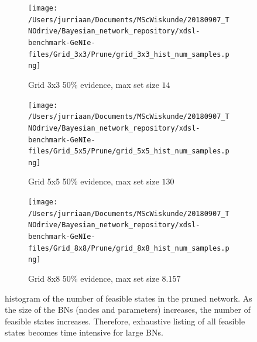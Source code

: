 \documentclass[a4paper, twoside, 11pt]{report}
\theoremstyle{plain}
\theoremstyle{definition}
\theoremstyle{remark}
\begin{document}
\begin{figure}[h!]
\begin{subfigure}{.3\linewidth}
\texttt{[image: /Users/jurriaan/Documents/MScWiskunde/20180907\_TNOdrive/Bayesian\_network\_repository/xdsl-benchmark-GeNIe-files/Grid\_3x3/Prune/grid\_3x3\_hist\_num\_samples.png]}
\caption{Grid 3x3 50\% evidence, max set size $14$}%
\label{grid_3x3}%
\end{subfigure}\hfill%
\begin{subfigure}{.3\linewidth}
\texttt{[image: /Users/jurriaan/Documents/MScWiskunde/20180907\_TNOdrive/Bayesian\_network\_repository/xdsl-benchmark-GeNIe-files/Grid\_5x5/Prune/grid\_5x5\_hist\_num\_samples.png]}
\caption{Grid 5x5 50\% evidence, max set size $130$}%
\label{grid_5x5}%
\end{subfigure}\hfill%
\begin{subfigure}{.3\linewidth}
\texttt{[image: /Users/jurriaan/Documents/MScWiskunde/20180907\_TNOdrive/Bayesian\_network\_repository/xdsl-benchmark-GeNIe-files/Grid\_8x8/Prune/grid\_8x8\_hist\_num\_samples.png]}
\caption{Grid 8x8 50\% evidence, max set size $8.157$}%
\label{grid_8x8}%
\end{subfigure}\hfill%

\vspace{0.75pc}
\caption{histogram of the number of feasible states in the pruned network. As the size of the BNs (nodes and parameters) increases, the number of feasible states increases. Therefore, exhaustive listing of all feasible states becomes time intensive for large BNs.}
\label{results4}
\end{figure}

\newpage
\end{document}
